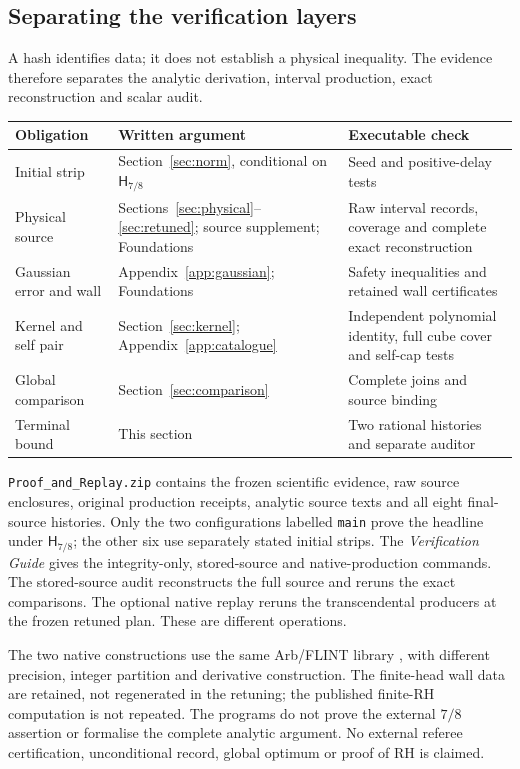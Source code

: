 \documentclass[11pt,a4paper]{article}
\theoremstyle{definition}\newtheorem{definition}[theorem]{Definition}
\theoremstyle{remark}\newtheorem{remark}[theorem]{Remark}
\newcommand{\HH}{\mathsf H}
\begin{document}
\subsection{Separating the verification layers}
A hash identifies data; it does not establish a physical inequality.
The evidence therefore separates the analytic derivation, interval
production, exact reconstruction and scalar audit.

\begin{center}\small
\begin{tabularx}{\textwidth}{@{}p{31mm}XX@{}}\toprule
Obligation & Written argument & Executable check\\\midrule
Initial strip & Section~\ref{sec:norm}, conditional on $\HH_{7/8}$ & Seed and positive-delay tests\\[3pt]
Physical source & Sections~\ref{sec:physical}--\ref{sec:retuned}; source supplement; Foundations & Raw interval records, coverage and complete exact reconstruction\\[3pt]
Gaussian error and wall & Appendix~\ref{app:gaussian}; Foundations & Safety inequalities and retained wall certificates\\[3pt]
Kernel and self pair & Section~\ref{sec:kernel}; Appendix~\ref{app:catalogue} & Independent polynomial identity, full cube cover and self-cap tests\\[3pt]
Global comparison & Section~\ref{sec:comparison} & Complete joins and source binding\\[3pt]
Terminal bound & This section & Two rational histories and separate auditor\\\bottomrule
\end{tabularx}
\end{center}

\texttt{Proof\_and\_Replay.zip} contains the frozen scientific evidence,
raw source enclosures, original production receipts, analytic source
texts and all eight final-source histories. Only the two configurations
labelled \texttt{main} prove the headline under $\HH_{7/8}$; the other
six use separately stated initial strips. The \emph{Verification Guide}
gives the integrity-only, stored-source and native-production commands.
The stored-source audit reconstructs the full source and reruns the exact
comparisons. The optional native replay reruns the transcendental
producers at the frozen retuned plan. These are different operations.

The two native constructions use the same Arb/FLINT library
\cite{arb}, with different precision, integer partition and derivative
construction. The finite-head wall data are retained, not regenerated in
the retuning; the published finite-RH computation is not repeated.
The programs do not prove the external $7/8$ assertion or formalise the
complete analytic argument. No external referee certification,
unconditional record, global optimum or proof of RH is claimed.
\end{document}
